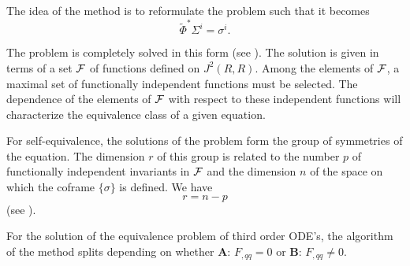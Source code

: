 The idea of the method is to reformulate the problem such that it 
becomes 
\begin{equation}
\tilde{\Phi}^{\ast} \Sigma^{i}=\sigma^{i}.
\end{equation}

The problem is completely solved in this form (see \cite{P_Kamran89}). 
The solution is given in terms of a set ${\cal F}$ of functions defined 
on $J^{2}(R,R)$. Among the elements of ${\cal F}$, a maximal set of 
functionally  independent functions must be selected. The dependence 
of the elements of ${\cal F}$ with respect to these independent functions 
 will characterize the equivalence class of a given equation. 

For self-equivalence, the solutions of the problem 
form the group of symmetries of the equation. The dimension $r$ of this group 
is related to the number $p$ of functionally independent invariants in 
${\cal F}$ 
and the dimension $n$ of the space on which the coframe $\{\sigma \}$ is 
defined. We have
\begin{equation}
r=n-p
\end{equation}
(see \cite{B_Gardn89} \cite{P_Kamran89} \cite{B_Sternberg64}).

For the solution of the equivalence problem of third order ODE's, 
the algorithm of the method splits depending on whether 
{\bf A}: $F_{,qq}=0$ or {\bf B}: $F_{,qq} \neq 0$. 

